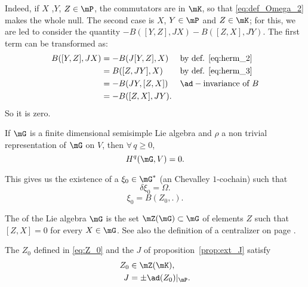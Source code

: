 Indeed, if $X$ ,$Y$, $Z\in\mP$, the commutators are in $\mK$, so that \eqref{eq:def_Omega_2} makes the whole null. The second case is $X$, $Y\in\mP$ and $Z\in\mK$; for this, we are led to consider the quantity $-B( [Y,Z],JX )-B([Z,X],JY)$. The first term can be transformed as:
\[
\begin{aligned}
  B([Y,Z],JX)&=-B(J[Y,Z],X)&&\text{by def. \eqref{eq:herm_2} } \\
             &=B([Z,JY],X)&&\text{by def.  \eqref{eq:herm_3}}\\
             &=-B(JY,[Z,X])&&\ad-\text{invariance of } B\\
	     &=-B([Z,X],JY).
\end{aligned}
\]
So it is zero.

\begin{lemma}
If $\mG$ is  a finite dimensional semisimple  Lie algebra and $\rho$ a non trivial representation of $\mG$ on $V$, then $\forall\,q\geq 0$,
\[
      H^q(\mG,V)=0.
\]
\end{lemma}

This gives us the existence of a $\xi_0\in\mG^*$ (an Chevalley $1$-cochain) such that
\[
   \delta\xi_0=\Omega.
\]
\begin{equation}\label{eq:Z_0}
   \xi_0=B(Z_0,.).
\end{equation}

\begin{definition}
	The  of the Lie algebra $\mG$ is the set $\mZ(\mG)\subset\mG$ of elements $Z$ such that $[Z,X]=0$ for every $X\in\mG$. See also the definition of a centralizer on page \pageref{PgDefCentralisateur}.
\end{definition}

\begin{proposition}
The $Z_0$ defined in \eqref{eq:Z_0} and the $J$ of proposition~\ref{prop:ext_J} satisfy
\begin{subequations}
\begin{align}
   Z_0&\in\mZ(\mK),\\
   J&=\pm\ad(Z_0)|_{\mP}.
\end{align}
\end{subequations}


\end{proposition}


